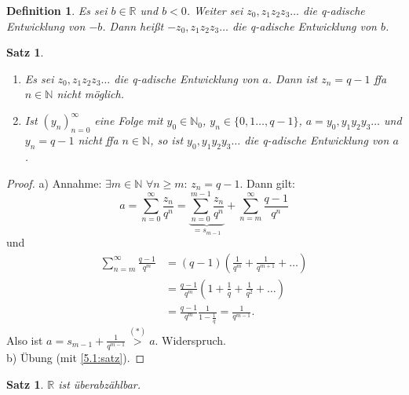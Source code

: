 \documentclass[12pt]{extreport} %
\newcommand{\N}{\mathbb{N}}
\newcommand{\R}{\mathbb{R}}
\theoremstyle{named}
\theoremstyle{itshape}
\newtheorem{satz}[unnamedtheorem]{Satz}
\newtheorem*{definition}{Definition}
\theoremstyle{normal}
\begin{document}
\begin{definition}
	Es sei $b \in \R$ und $b < 0$. Weiter sei $z_{0}, z_{1} z_{2} z_3 \dotsc $
	die q-adische Entwicklung von $-b$. Dann hei{\ss}t $- z_{0}, z_{1} z_{2} z_3\dotsc$ die q-adische Entwicklung von $b$.
\end{definition}


\begin{satz} \label{5.2:satz} ~\
\begin{enumerate}
\item Es sei $z_{0}, z_{1} z_{2} z_{3} \dotsc$ die q-adische Entwicklung von $a$. Dann ist $z_{n} = q-1$ ffa $n \in \N$ nicht möglich.
\item Ist $(y_n)_{n=0}^\infty$ eine Folge mit $y_0 \in \N_0$, $y_n \in \{0,1 \dots, q-1\}$, $a = y_{0}, y_{1} y_{2} y_{3} \dotsc$ und 
$y_{n} = q-1$ nicht ffa $n \in \N$, so ist $y_{0}, y_{1} y_{2} y_{3} \dotsc$ die q-adische Entwicklung von $a$.
\end{enumerate}	
\end{satz}

\begin{proof}
	a) Annahme: $\exists m \in \N$ $\forall n \geq m$: $z_{n} = q - 1$. Dann gilt:
		$$ a = \sum_{n=0}^{\infty} \frac{z_{n}}{q^{n}} = \underbrace{\sum_{n=0}^{m-1} \frac{z_{n}}{q^{n}}}_{= s_{m-1}} + \sum_{n=m}^{\infty} \frac{q-1}{q^{n}} $$
	und 
	\begin{align*}
		\sum_{n=m}^{\infty} \frac{q-1}{q^{m}} & = (q-1) \left( \frac{1}{q^{m}} + \frac{1}{q^{m+1}} + \dotsc \right) \\
			& = \frac{q - 1}{q^{m}} \left(1 + \frac{1}{q} + \frac{1}{q^{2}} + \dotsc\right) \\
			& = \frac{q - 1}{q^{m}} \frac{1}{1 - \frac{1}{q}} = \frac{1}{q^{m-1}}.
	\end{align*} 
	Also ist $a = s_{m-1} + \frac{1}{q^{m-1}} \overset{(*)}{>} a$. Widerspruch. \\
	b) Übung (mit \ref{5.1:satz}).
\end{proof}


\begin{satz} \label{5.3:satz}
	$\R$ ist überabzählbar.
\end{satz}
\end{document}
